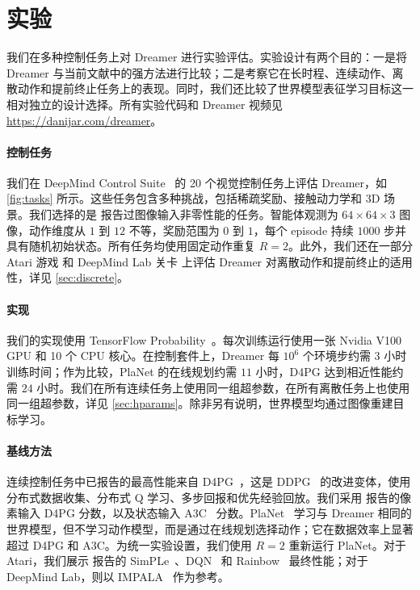 \section{实验}
\label{sec:experiments}



我们在多种控制任务上对 Dreamer 进行实验评估。实验设计有两个目的：一是将 Dreamer 与当前文献中的强方法进行比较；二是考察它在长时程、连续动作、离散动作和提前终止任务上的表现。同时，我们还比较了世界模型表征学习目标这一相对独立的设计选择。所有实验代码和 Dreamer 视频见 \mbox{\url{https://danijar.com/dreamer}}。

\paragraph{控制任务}

我们在 DeepMind Control Suite~\cite{tassa2018dmcontrol} 的 20 个视觉控制任务上评估 Dreamer，如 \cref{fig:tasks} 所示。这些任务包含多种挑战，包括稀疏奖励、接触动力学和 3D 场景。我们选择的是 \citet{tassa2018dmcontrol} 报告过图像输入非零性能的任务。智能体观测为 $64\times64\times3$ 图像，动作维度从 $1$ 到 $12$ 不等，奖励范围为 $0$ 到 $1$，每个 episode 持续 $1000$ 步并具有随机初始状态。所有任务均使用固定动作重复 $R=2$。此外，我们还在一部分 Atari 游戏\citep{bellemare2013ale} 和 DeepMind Lab 关卡\citep{beattie2016dmlab} 上评估 Dreamer 对离散动作和提前终止的适用性，详见 \cref{sec:discrete}。

\paragraph{实现}

我们的实现使用 TensorFlow Probability~\citep{dillon2017tfd}。每次训练运行使用一张 Nvidia V100 GPU 和 10 个 CPU 核心。在控制套件上，Dreamer 每 $10^6$ 个环境步约需 $3$ 小时训练时间；作为比较，PlaNet 的在线规划约需 $11$ 小时，D4PG 达到相近性能约需 $24$ 小时。我们在所有连续任务上使用同一组超参数，在所有离散任务上也使用同一组超参数，详见 \cref{sec:hparams}。除非另有说明，世界模型均通过图像重建目标学习。

\paragraph{基线方法}

连续控制任务中已报告的最高性能来自 D4PG~\citep{barth2018d4pg}，这是 DDPG~\citep{lillicrap2015ddpg} 的改进变体，使用分布式数据收集、分布式 Q 学习、多步回报和优先经验回放。我们采用 \citet{tassa2018dmcontrol} 报告的像素输入 D4PG 分数，以及状态输入 A3C~\citep{mnih2016a3c} 分数。PlaNet~\citep{hafner2018planet} 学习与 Dreamer 相同的世界模型，但不学习动作模型，而是通过在线规划选择动作；它在数据效率上显著超过 D4PG 和 A3C。为统一实验设置，我们使用 $R=2$ 重新运行 PlaNet。对于 Atari，我们展示 \citet{castro2018dopamine} 报告的 SimPLe~\citep{kaiser2019simple}、DQN~\citep{mnih2015dqn} 和 Rainbow~\citep{hessel2018rainbow} 最终性能；对于 DeepMind Lab，则以 IMPALA~\citep{espeholt2018impala} 作为参考。


